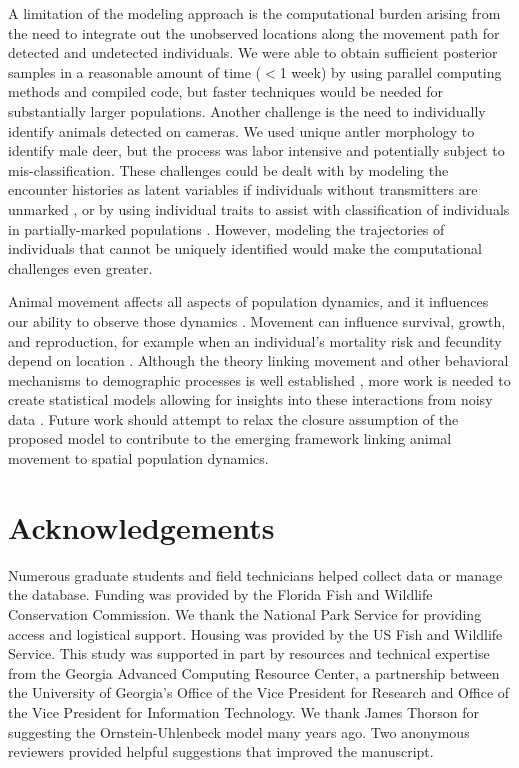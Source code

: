\documentclass[12pt]{article}
\begin{document}
A limitation of the modeling approach is the computational burden
arising from the need to integrate out the unobserved locations along
the movement path for detected and undetected individuals. We were
able to obtain sufficient posterior samples in a reasonable amount of
time ($<$1 week) by using parallel computing methods and compiled
code, but faster techniques would be needed for substantially larger
populations. Another challenge is the need to individually identify
animals detected on cameras. We used unique antler morphology to
identify male deer, but the process was labor intensive and
potentially subject to mis-classification. These challenges could be
dealt with by modeling the encounter histories as latent variables if
individuals without transmitters are unmarked
\citep{chandler_royle:2013,sollmann_etal:2013jae,sollmann_etal:2013ecol},
or by using individual traits to assist with classification of
individuals in partially-marked populations
\citep{augustine_etal:2018}. However, modeling the trajectories of  
individuals that cannot be uniquely identified would make the
computational challenges even greater. 

Animal movement affects all aspects of population dynamics, and
it influences our ability to observe those dynamics
\citep{nichols_kendall:1995,royle_etal:2014,hooten_etal:2017,glennie_etal:2020}. 
Movement can influence survival, growth, and reproduction, for example
when an individual's mortality risk and fecundity depend on location
\citep{conroy_etal:1996,clobert_etal:2012}. Although the theory
linking movement and other behavioral mechanisms to demographic
processes is well established
\citep{lima_zollner:1996,morales_etal:2010,gurevitch_etal:2016}, more
work is needed to create statistical models allowing 
for insights into these interactions from noisy data
\citep{ergon_gardner:2014,raabe_etal:2014,schaub_royle:2014,dorazio_price:2019}.
Future work should attempt to relax the closure assumption of the
proposed model to contribute to the emerging framework linking animal
movement to spatial population dynamics. 


\section{Acknowledgements}

Numerous graduate students and field technicians helped collect data
or manage the database. Funding was provided by the Florida Fish and
Wildlife Conservation Commission. We thank the National Park
Service for providing access and logistical support. Housing was
provided by the US Fish and Wildlife Service.  
This study was supported in part by resources and technical expertise
from the Georgia Advanced Computing Resource Center, a partnership
between the University of Georgia’s Office of the Vice President for
Research and Office of the Vice President for Information Technology. 
We thank James Thorson for suggesting the Ornstein-Uhlenbeck model
many years ago. Two anonymous reviewers provided helpful suggestions
that improved the manuscript.
\end{document}
